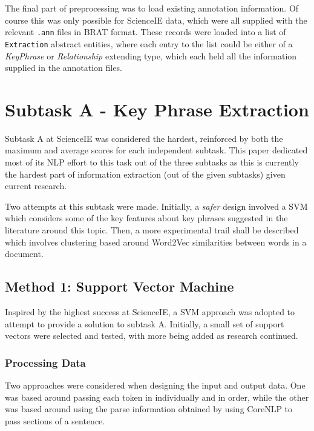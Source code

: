 The final part of preprocessing was to load existing annotation information. Of course this was only possible for ScienceIE data, which were all supplied with the relevant \texttt{.ann} files in BRAT format. These records were loaded into a list of \texttt{Extraction} abstract entities, where each entry to the list could be either of a \textit{KeyPhrase} or \textit{Relationship} extending type, which each held all the information supplied in the annotation files.

\section{Subtask A - Key Phrase Extraction}
Subtask A at ScienceIE was considered the hardest, reinforced by both the maximum and average scores for each independent subtask. This paper dedicated most of its NLP effort to this task out of the three subtasks as this is currently the hardest part of information extraction (out of the given subtasks) given current research. 

Two attempts at this subtask were made. Initially, a \textit{safer} design involved a SVM which considers some of the key features about key phrases suggested in the literature around this topic. Then, a more experimental trail shall be described which involves clustering based around Word2Vec similarities between words in a document. 

\subsection{Method 1: Support Vector Machine}
Inspired by the highest success at ScienceIE, a SVM approach was adopted to attempt to provide a solution to subtask A. Initially, a small set of support vectors were selected and tested, with more being added as research continued.

\subsubsection*{Processing Data}
Two approaches were considered when designing the input and output data. One was based around passing each token in individually and in order, while the other was based around using the parse information obtained by using CoreNLP to pass sections of a sentence. 


